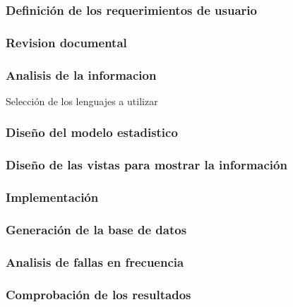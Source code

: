 \subsubsection{Definición de los requerimientos de usuario}

\subsubsection{Revision documental}

\subsubsection{Analisis de la informacion}
Selección de los lenguajes a utilizar

\subsubsection{Diseño del modelo estadistico}

\subsubsection{Diseño de las vistas para mostrar la información}



\subsubsection{Implementación}

    \subsubsection{Generación de la base de datos}
    \subsubsection{Analisis de fallas en frecuencia}

\subsubsection{Comprobación de los resultados}


